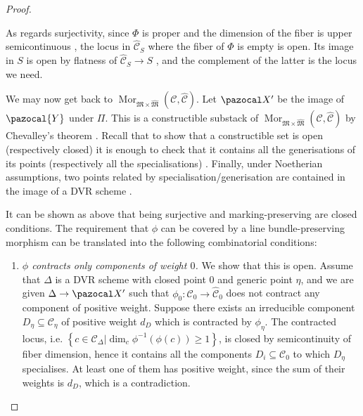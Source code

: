 \documentclass[11pt]{amsart}
\renewcommand{\to}{\rightarrow}
\newcommand{\X}{\pazocal X}
\newcommand{\cC}{\mathcal C}
\newcommand{\hC}{\widehat{\mathcal C}}
\newcommand{\MM}{\mathfrak M}
\newcommand{\hM}{\widehat{\mathfrak M}}
\newcommand{\dvr}{\Delta}
\theoremstyle{plain}
\theoremstyle{definition}
\begin{document}
\begin{proof}
\begin{description}[labelindent=0cm,leftmargin=\parindent]
As regards surjectivity, since $\Phi$ is proper and the dimension of the fiber is upper semicontinuous \cite[\href{http://stacks.math.columbia.edu/tag/0D4I}{Tag 0D4I}]{stacks-project}, the locus in $\hC_S$ where the fiber of $\Phi$ is empty is open. Its image in $S$ is open by flatness of $\hC_S\to S$ \cite[\href{http://stacks.math.columbia.edu/tag/01UA}{Tag 01UA}]{stacks-project}, and the complement of the latter is the locus we need.
 
\item[Step 3] We may now get back to $\operatorname{Mor}_{\MM\times\hM}(\cC,\hC)$. Let $\X'$ be the image of $\pazocal{Y}$ under $\Pi$. This is a constructible substack of $\operatorname{Mor}_{\MM\times\hM}(\cC,\hC)$ by Chevalley's theorem \cite[Theorem 5.9.4]{LMB}. Recall that to show that a constructible set is open (respectively closed) it is enough to check that it contains all the generisations of its points (respectively all the specialisations) \cite[\href{http://stacks.math.columbia.edu/tag/0DQN}{Tag 0DQN}\href{http://stacks.math.columbia.edu/tag/0903}{Tag 0903}]{stacks-project}. Finally, under Noetherian assumptions, two points related by specialisation/generisation are contained in the image of a DVR scheme \cite[\href{http://stacks.math.columbia.edu/tag/054F}{Tag 054F}]{stacks-project}.

It can be shown as above that being surjective and marking-preserving are closed conditions. The requirement that $\phi$ can be covered by a line bundle-preserving morphism can be translated into the following combinatorial conditions:

\begin{enumerate}
\item\emph{$\phi$ contracts only components of weight $0$.} We show that this is open. Assume that $\dvr$ is a DVR scheme with closed point $0$ and generic point $\eta$, and we are given $\dvr\to\X'$ such that $\phi_0\colon\cC_0\to \hC_0$ does not contract any component of positive weight. Suppose there exists an irreducible component $D_\eta\subseteq \cC_{\eta}$ of positive weight $d_D$ which is contracted by $\phi_{\eta}.$ The contracted locus, i.e. $\left\{c\in \cC_{\dvr} | \dim_c\phi^{-1}(\phi(c))\geq 1\right\}$, is closed by semicontinuity of fiber dimension, hence it contains all the components $D_i\subseteq \cC_0$ to which $D_\eta$ specialises. At least one of them has positive weight, since the sum of their weights is $d_D$, which is a contradiction.


\end{enumerate}
\end{description}
\end{proof}
\end{document}
